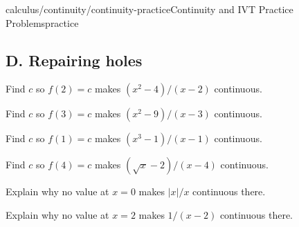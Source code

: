 \begin{webpage}{calculus/continuity/continuity-practice}{Continuity and IVT Practice Problems}{practice}
\subsection*{D. Repairing holes}
\begin{bgexercises}[label=\textbf{5.\arabic*},resume]
  \item Find \(c\) so \(f(2)=c\) makes \((x^2-4)/(x-2)\) continuous.
  \item Find \(c\) so \(f(3)=c\) makes \((x^2-9)/(x-3)\) continuous.
  \item Find \(c\) so \(f(1)=c\) makes \((x^3-1)/(x-1)\) continuous.
  \item Find \(c\) so \(f(4)=c\) makes \((\sqrt{x}-2)/(x-4)\) continuous.
  \item Explain why no value at \(x=0\) makes \(|x|/x\) continuous there.
  \item Explain why no value at \(x=2\) makes \(1/(x-2)\) continuous there.
\end{bgexercises}


\end{webpage}
